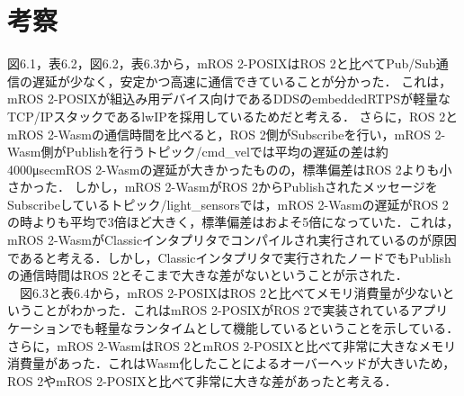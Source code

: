 \section{考察}
図6.1，表6.2，図6.2，表6.3から，mROS 2-POSIXはROS 2と比べてPub/Sub通信の遅延が少なく，安定かつ高速に通信できていることが分かった．
これは，mROS 2-POSIXが組込み用デバイス向けであるDDSのembeddedRTPSが軽量なTCP/IPスタックであるlwIPを採用しているためだと考える．
さらに，ROS 2とmROS 2-Wasmの通信時間を比べると，ROS 2側がSubscribeを行い，mROS 2-Wasm側がPublishを行うトピック/cmd\_velでは平均の遅延の差は約4000μsecmROS 2-Wasmの遅延が大きかったものの，標準偏差はROS 2よりも小さかった．
しかし，mROS 2-WasmがROS 2からPublishされたメッセージをSubscribeしているトピック/light\_sensorsでは，mROS 2-Wasmの遅延がROS 2の時よりも平均で3倍ほど大きく，標準偏差はおよそ5倍になっていた．これは，mROS 2-WasmがClassicインタプリタでコンパイルされ実行されているのが原因であると考える．しかし，Classicインタプリタで実行されたノードでもPublishの通信時間はROS 2とそこまで大きな差がないということが示された．
\\　図6.3と表6.4から，mROS 2-POSIXはROS 2と比べてメモリ消費量が少ないということがわかった．これはmROS 2-POSIXがROS 2で実装されているアプリケーションでも軽量なランタイムとして機能しているということを示している．さらに，mROS 2-WasmはROS 2とmROS 2-POSIXと比べて非常に大きなメモリ消費量があった．これはWasm化したことによるオーバーヘッドが大きいため，ROS 2やmROS 2-POSIXと比べて非常に大きな差があったと考える．

